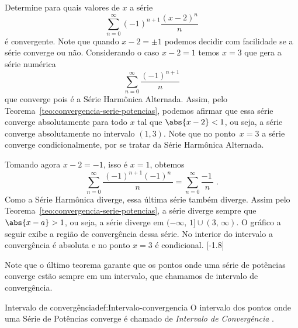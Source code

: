 \begin{example}
  Determine para quais valores de $x$ a série
  \[
    \sum_{n=0}^\infty (-1)^{n+1}\frac{(x-2)^n}{n}
  \]
  é convergente.
  \solution
  Note que quando $x-2=\pm 1$ podemos decidir com facilidade se a série converge ou não.
  Considerando o caso $x-2=1$ temos $x=3$ que gera a série numérica
  \[
    \sum_{n=0}^\infty\frac{ (-1)^{n+1}}{n}
  \]
  que converge pois é a Série Harmônica Alternada.
  Assim, pelo Teorema~\ref{teo:convergencia-serie-potencias},
  podemos afirmar que essa série converge absolutamente para todo $x$ tal que $\abs{x-2}<1$,
  ou seja, a série converge absolutamente no intervalo $(1, 3)$.
  Note que no ponto~$x=3$ a série converge condicionalmente,
  por se tratar da Série Harmônica Alternada.

  Tomando agora $x-2=-1$, isso é $x=1$, obtemos
  \[
    \sum_{n=0}^\infty\frac{\,(-1)^{n+1}(-1)^n\,}{n}
    = \sum_{n=0}^\infty\frac{-1\,}{n} \;.
  \]
  Como a Série Harmônica diverge, essa última série também diverge.
  Assim pelo Teorema~\ref{teo:convergencia-serie-potencias},
  a série diverge sempre que $\abs{x-a}>1$, ou seja,
  a série diverge em $(-\infty,\,1]\cup (3,\,\infty)$.
  O gráfico a seguir exibe a região de convergência dessa série.
  No interior do intervalo a convergência é absoluta e no ponto $x=3$ é condicional.
  [-1.8]
\end{example}

Note que o último teorema garante que os pontos onde uma série de potências
converge estão sempre em um intervalo, que chamamos de intervalo de convergência.

\begin{definicao}{Intervalo de convergência}{def:Intervalo-convergencia}
  O intervalo dos pontos onde uma Série de Potências converge é chamado de
  \emph{Intervalo de Convergência}%
  .
\end{definicao}

